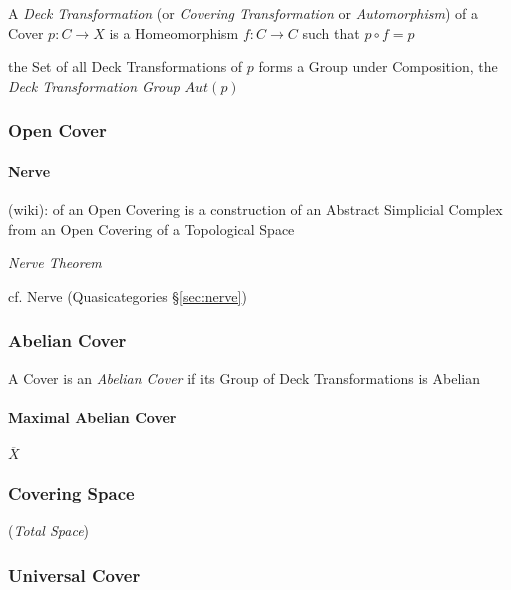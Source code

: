 A \emph{Deck Transformation} (or \emph{Covering Transformation} or
\emph{Automorphism}) of a Cover $p : C \rightarrow X$ is a
Homeomorphism $f : C \rightarrow C$ such that $p \circ f = p$

the Set of all Deck Transformations of $p$ forms a Group under
Composition, the \emph{Deck Transformation Group} $Aut(p)$



\subsubsection{Open Cover}\label{sec:open_cover}

\paragraph{Nerve}\label{sec:covering_nerve}\hfill

(wiki): of an Open Covering is a construction of an Abstract Simplicial Complex
from an Open Covering of a Topological Space

\emph{Nerve Theorem}

cf. Nerve (Quasicategories \S\ref{sec:nerve})



\subsubsection{Abelian Cover}\label{sec:abelian_cover}

A Cover is an \emph{Abelian Cover} if its Group of Deck
Transformations is Abelian



\paragraph{Maximal Abelian Cover}\label{sec:maximal_abelian_cover}\hfill

$\overline{X}$


\subsubsection{Covering Space}\label{sec:covering_space}

(\emph{Total Space})



\subsubsection{Universal Cover}\label{sec:universal_cover}\hfill

